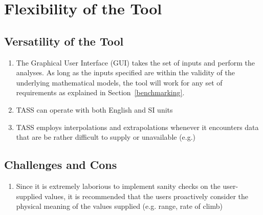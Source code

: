 \documentclass[pdftex,11pt,letter]{article}
\begin{document}
\section{Flexibility of the Tool}
\label{appendix:flexibility}

\subsection{Versatility of the Tool}

\begin{enumerate}

\item The Graphical User Interface (GUI) takes the set of inputs and perform the analyses. As long as the inputs specified are within the validity of the underlying mathematical models, the tool will work for any set of requirements as explained in Section~\ref{benchmarking}.

\item TASS can operate with both English and SI units

\item TASS employs interpolations and extrapolations whenever it encounters data that are be rather difficult to supply or unavailable (e.g.) 

\end{enumerate}

\subsection{Challenges and Cons}

\begin{enumerate}

\item  Since it is extremely laborious to implement sanity checks on the user-supplied values, it is recommended that the users proactively consider the physical meaning of the values supplied (e.g. range, rate of climb)

\end{enumerate}
\end{document}
